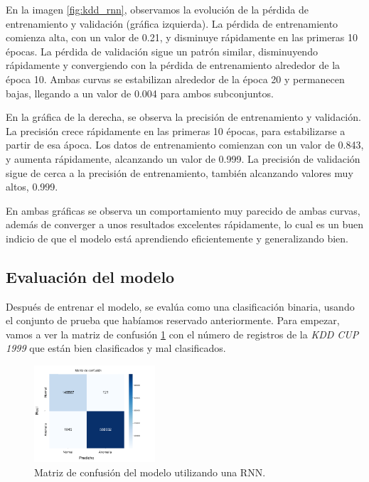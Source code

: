 En la imagen \ref{fig:kdd_rnn}, observamos la evolución de la pérdida de entrenamiento y validación (gráfica izquierda). La pérdida de entrenamiento comienza alta, con un valor de 0.21, y disminuye rápidamente en las primeras 10 épocas. La pérdida de validación sigue un patrón similar, disminuyendo rápidamente y convergiendo con la pérdida de entrenamiento alrededor de la época 10. Ambas curvas se estabilizan alrededor de la época 20 y permanecen bajas, llegando a un valor de 0.004 para ambos subconjuntos. 

En la gráfica de la derecha, se observa la precisión de entrenamiento y validación. La precisión crece rápidamente en las primeras 10 épocas, para estabilizarse a partir de esa ápoca. Los datos de entrenamiento comienzan con un valor de 0.843, y aumenta rápidamente, alcanzando un valor de 0.999. La precisión de validación sigue de cerca a la precisión de entrenamiento, también alcanzando valores muy altos, 0.999. 

En ambas gráficas se observa un comportamiento muy parecido de ambas curvas, además de converger a unos resultados excelentes rápidamente, lo cual es un buen indicio de que el modelo está aprendiendo eficientemente y generalizando bien. 


\subsection{Evaluación del modelo}

Después de entrenar el modelo, se evalúa como una clasificación binaria, usando el conjunto de prueba que habíamos reservado anteriormente. Para empezar, vamos a ver la matriz de confusión \ref{fig: rnnKDDConfusion} con el número de registros de la \textit{KDD CUP 1999} que están bien clasificados y mal clasificados.

\begin{figure}[H]
    \centering
    \includegraphics[width=0.4\textwidth]{img/confusionMatrixRNN_KDD.png}
    \caption{Matriz de confusión del modelo utilizando una RNN.}
    \label{fig: rnnKDDConfusion}
\end{figure}


